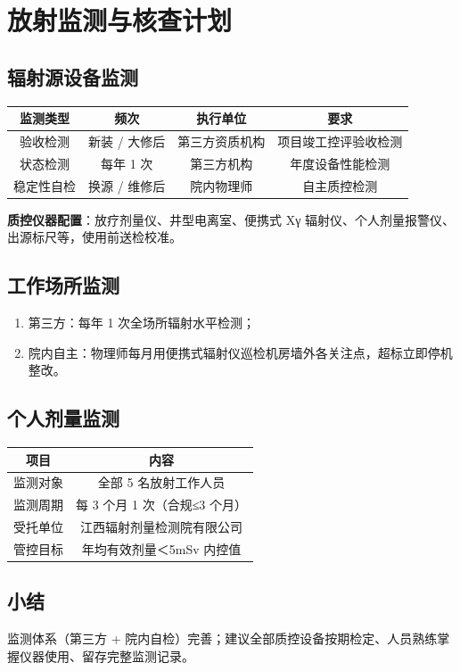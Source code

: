 \chapter{放射监测与核查计划}

\section{辐射源设备监测}

\begin{table}[H]
\centering
\begin{tabular}{|c|c|c|c|}
\hline
监测类型 & 频次 & 执行单位 & 要求 \\
\hline
验收检测 & 新装 / 大修后 & 第三方资质机构 & 项目竣工控评验收检测 \\
\hline
状态检测 & 每年 1 次 & 第三方机构 & 年度设备性能检测 \\
\hline
稳定性自检 & 换源 / 维修后 & 院内物理师 & 自主质控检测 \\
\hline
\end{tabular}
\end{table}


\textbf{质控仪器配置}：放疗剂量仪、井型电离室、便携式 Xγ 辐射仪、个人剂量报警仪、出源标尺等，使用前送检校准。

\section{工作场所监测}

\begin{enumerate}
\item 第三方：每年 1 次全场所辐射水平检测；
\item 院内自主：物理师每月用便携式辐射仪巡检机房墙外各关注点，超标立即停机整改。
\end{enumerate}

\section{个人剂量监测}

\begin{table}[H]
\centering
\begin{tabular}{|c|c|}
\hline
项目 & 内容 \\
\hline
监测对象 & 全部 5 名放射工作人员 \\
\hline
监测周期 & 每 3 个月 1 次（合规≤3 个月） \\
\hline
受托单位 & 江西辐射剂量检测院有限公司 \\
\hline
管控目标 & 年均有效剂量＜5mSv 内控值 \\
\hline
\end{tabular}
\end{table}


\section{小结}

监测体系（第三方 + 院内自检）完善；建议全部质控设备按期检定、人员熟练掌握仪器使用、留存完整监测记录。
